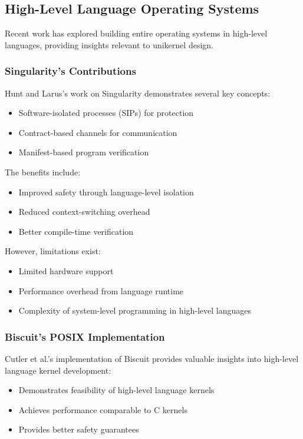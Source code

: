 \documentclass[conference]{IEEEtran}
\begin{document}
\subsection{High-Level Language Operating Systems}
Recent work has explored building entire operating systems in high-level languages, providing insights relevant to unikernel design.

\subsubsection{Singularity's Contributions}
Hunt and Larus's work on Singularity \cite{singularity} demonstrates several key concepts:
\begin{itemize}
	\item Software-isolated processes (SIPs) for protection
	\item Contract-based channels for communication
	\item Manifest-based program verification
\end{itemize}

The benefits include:
\begin{itemize}
	\item Improved safety through language-level isolation
	\item Reduced context-switching overhead
	\item Better compile-time verification
\end{itemize}

However, limitations exist:
\begin{itemize}
	\item Limited hardware support
	\item Performance overhead from language runtime
	\item Complexity of system-level programming in high-level languages
\end{itemize}

\subsubsection{Biscuit's POSIX Implementation}
Cutler et al.'s implementation of Biscuit \cite{go_kernel} provides valuable insights into high-level language kernel development:
\begin{itemize}
	\item Demonstrates feasibility of high-level language kernels
	\item Achieves performance comparable to C kernels
	\item Provides better safety guarantees
\end{itemize}
\end{document}
